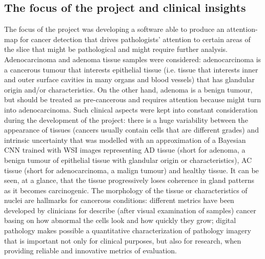 \documentclass[12pt]{article}
\begin{document}
\subsection{The focus of the project and clinical insights}
The focus of the project was developing a software able to produce an attention-map for cancer detection that drives pathologists’ attention to certain areas of the slice that might be pathological and might require further analysis. \cite{digpat3} \\ 
Adenocarcinoma and adenoma tissue samples were considered: adenocarcinoma is a cancerous tumour that interests epithelial tissue (i.e. tissue that interests inner and outer surface cavities in many organs and blood vessels) that has glandular origin and/or characteristics. On the other hand, adenoma is a benign tumour, but should be treated as pre-cancerous and requires attention because might turn into adenocarcinoma.
Such clinical aspects were kept into constant consideration during the development of the project: there is a huge variability between the appearance of tissues (cancers usually contain cells that are different grades) and intrinsic uncertainty that was modelled with an approximation of a Bayesian CNN trained with WSI images representing AD tissue (short for adenoma, a benign tumour of epithelial tissue with glandular origin or characteristics), AC tissue (short for adenocarcinoma, a malign tumour) and healthy tissue. It can be seen, at a glance, that the tissue progressively loses coherence in gland patterns as it becomes carcinogenic. The morphology of the tissue or characteristics of nuclei are hallmarks for cancerous conditions: different metrics have been developed by clinicians for describe (after visual examination of samples) cancer basing on how abnormal the cells look and how quickly they grow; digital pathology makes possible a quantitative characterization of pathology imagery that is important not only for clinical purposes, but also for research, when providing reliable and innovative metrics of evaluation.\cite{digpat1}
\end{document}
